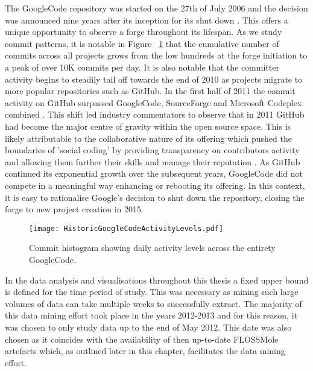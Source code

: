 The GoogleCode repository was started on the 27th of July 2006 \citep{shankland2006google} and the decision was announced nine years after its inception for its shut down \citep{dibona2006bidding}. This offers a unique opportunity to observe a forge throughout its lifespan. As we study commit patterns, it is notable in Figure ~\ref{fig:HistoricGoogleCodeActivityLevels} that the cumulative number of commits across all projects grows from the low hundreds at the forge initiation to a peak of over 10K commits per day. It is also notable that the committer activity begins to steadily tail off towards the end of 2010 as projects migrate to more popular repositories such as GitHub. In the first half of 2011 the commit activity on GitHub surpassed GoogleCode, SourceForge and Microsoft Codeplex combined \citep{redmonk2011}. This shift led industry commentators to observe that in 2011 GitHub had become the major centre of gravity within the open source space. This is likely attributable to the collaborative nature of its offering which pushed the boundaries of 'social coding' by providing transparency on contributors activity and allowing them further their skills and manage their reputation \citep{dabbish2012social}. As GitHub continued its exponential growth over the subsequent years, GoogleCode did not compete in a meaningful way enhancing or rebooting its offering. In this context, it is easy to rationalise Google's decision to shut down the repository, closing the forge to new project creation in 2015.
 
\begin{figure}[htbp!] 
\centering    
\texttt{[image: HistoricGoogleCodeActivityLevels.pdf]}
\caption{Commit histogram showing daily activity levels across the entirety GoogleCode.}
\label{fig:HistoricGoogleCodeActivityLevels}
\end{figure}

In the data analysis and visualisations throughout this thesis a fixed upper bound is defined for the time period of study. This was necessary as mining such large volumes of data can take multiple weeks to successfully extract. The majority of this data mining effort took place in the years 2012-2013 and for this reason, it was chosen to only study data up to the end of May 2012. This date was also chosen as it coincides with the availability of then up-to-date FLOSSMole artefacts which, as outlined later in this chapter, facilitates the data mining effort.  

